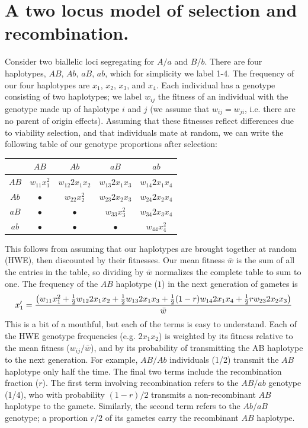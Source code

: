 \section{A two locus model of selection and recombination.}
Consider two biallelic loci segregating for $A/a$ and $B/b$. There are four haplotypes, $AB$, $Ab$, $aB$, $ab$, which for simplicity we label 1-4. The frequency of our four haplotypes are $x_1$, $x_2$, $x_3$, and $x_4$. Each individual has a genotype consisting of two haplotypes; we label $w_{ij}$ the fitness of an individual with the genotype made up of haplotype $i$ and $j$ (we assume that $w_{ij}=w_{ji}$, i.e. there are no parent of origin effects). Assuming that these fitnesses reflect differences due to viability selection, and that individuals mate at random, we can write the following table of our genotype proportions after selection:\\
\begin{center}
\begin{tabular}{c|cccc}
         & $AB$			& $Ab$				& $aB$				& $ab$\\
\hline
$AB$ & $w_{11} x_1^2$ 	& $w_{12} 2 x_1 x_2$  	& $w_{13} 2 x_1 x_3$ 	& $w_{14} 2 x_1 x_4$ \\
$Ab$ & $\bullet$ 	  	& $w_{22} x_2^2$ 	  	& $w_{23} 2 x_2 x_3$  	& $w_{24} 2 x_2 x_4$ \\  
$aB$ & $\bullet$ 		& $\bullet$ 			& $w_{33} x_3^2$ 	  	& $w_{34} 2 x_3 x_4$ \\  
$ab$ & $\bullet$ 		& $\bullet$			& $\bullet$ 			&  $w_{44} x_4^2$ \\
\end{tabular}
\end{center}
This follows from assuming that our haplotypes are brought together at random (HWE), then discounted by their fitnesses. Our mean fitness $\bar{w}$ is the sum of all the entries in the table, so dividing by $\bar{w}$ normalizes the complete table to sum to one. The frequency of the $AB$ haplotype ($1$) in the next generation of gametes is
\begin{equation}
x_1' = \frac{\big( w_{11} x_1^2 +	 \tfrac{1}{2} w_{12} 2 x_1 x_2  + \tfrac{1}{2} w_{13} 2x_1 x_3  +	 \tfrac{1}{2} (1-r) w_{14} 2 x_1 x_4 + \tfrac{1}{2} r w_{23} 2 x_2 x_3   \big)}{ \bar{w} } \label{eqn:hapfreq}
\end{equation}
This is a bit of a mouthful, but each of the terms is easy to understand. Each of the HWE genotype frequencies (e.g. $2x_1x_2$) is weighted by its fitness relative to the mean fitness ($w_{ij}/\bar{w}$), and by its probability of transmitting the AB haplotype to the next generation. For example, $AB/Ab$ individuals (1/2) transmit the $AB$ haplotype only half the time. The final two terms include the recombination fraction ($r$). The first term involving recombination refers to the $AB/ab$ genotype (1/4), who with probability $(1-r)/2$ transmits a non-recombinant $AB$ haplotype to the gamete. Similarly, the second term refers to the  $Ab/aB$ genotype; a proportion $r/2$ of its gametes carry the recombinant $AB$ haplotype. 

